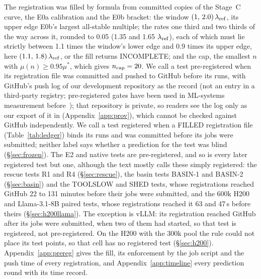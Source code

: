 The registration was filled by formula from committed copies of the Stage~C curve, the E0a calibration and the E0b bracket: the window $(1,\,2.0)\,\lambda_{\mathrm{ref}}$, its upper edge E0b's largest all-stable multiple; the rates one third and two thirds of the way across it, rounded to 0.05 (1.35 and 1.65 $\lambda_{\mathrm{ref}}$), each of which must lie strictly between 1.1 times the window's lower edge and 0.9 times its upper edge, here $(1.1,\,1.8)\,\lambda_{\mathrm{ref}}$, or the fill returns INCOMPLETE; and the cap, the smallest $n$ with $\mu(n)\ge0.95\mu^*$, which gives $n_{\mathrm{cap}}=20$. We call a test pre-registered when its registration file was committed and pushed to GitHub before its runs, with GitHub's push log of our development repository as the record (not an entry in a third-party registry; pre-registered gates have been used in ML-systems measurement before~\citep{suram2026cacheable}); that repository is private, so readers see the log only as our export of it in  (Appendix~\ref{app:prov}), which cannot be checked against GitHub independently. We call a test registered when a FILLED registration file (Table~\ref{tab:ledger}) binds its runs and was committed before its jobs were submitted; neither label says whether a prediction for the test was blind (\S\ref{sec:frozen}). The E2 and native tests are pre-registered, and so is every later registered test but one, although the text mostly calls these simply registered: the rescue tests R1 and R4 (\S\ref{sec:rescue}), the basin tests BASIN-1 and BASIN-2 (\S\ref{sec:basin}) and the TOOLSLOW and SHED tests, whose registrations reached GitHub 22 to 131 minutes before their jobs were submitted, and the 600k H200 and Llama-3.1-8B paired tests, whose registrations reached it 63 and 47\,s before theirs (\S\ref{sec:h200llama}). The exception is vLLM: its registration reached GitHub after its jobs were submitted, when two of them had started, so that test is registered, not pre-registered. On the H200 with the 300k pool the rule could not place its test points, so that cell has no registered test (\S\ref{sec:h200}). Appendix~\ref{app:prereg} gives the fill, its enforcement by the job script and the push time of every registration, and Appendix~\ref{app:timeline} every prediction round with its time record.

